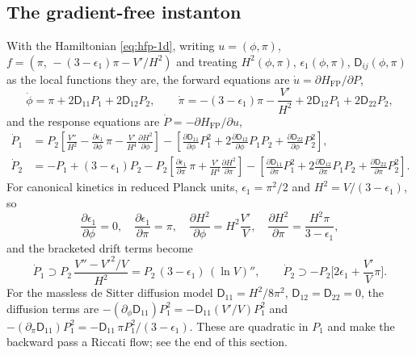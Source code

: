 \documentclass[a4paper,11pt]{article}
\newcommand{\epsSR}{\epsilon_1}              %
\newcommand{\Hub}{H}                         %
\newcommand{\field}{\phi}                    %
\newcommand{\mom}{\pi}                       %
\newcommand{\Vpot}{V}                        %
\newcommand{\Dcm}[1]{\mathsf{D}_{#1}}        %
\newcommand{\Hfp}{H_{\mathrm{FP}}}            %
\begin{document}
\subsection{The gradient-free instanton}
\label{sec:fullinstanton-eqs}

With the Hamiltonian \eqref{eq:hfp-1d}, writing $u=(\field,\mom)$,
$f=(\mom,\,-(3-\epsSR)\mom-\Vpot'/\Hub^2)$ and treating
$\Hub^2(\field,\mom)$, $\epsSR(\field,\mom)$, $\Dcm{ij}(\field,\mom)$ as the
local functions they are, the forward equations are $\dot u=\partial\Hfp/\partial P$,
\begin{equation}
    \dot\field = \mom + 2\Dcm{11}P_1 + 2\Dcm{12}P_2 ,
    \qquad
    \dot\mom = -(3-\epsSR)\mom - \frac{\Vpot'}{\Hub^2} + 2\Dcm{12}P_1 + 2\Dcm{22}P_2 ,
    \label{eq:fi-forward}
\end{equation}
and the response equations are $\dot P=-\partial\Hfp/\partial u$,
\begin{subequations}
\label{eq:fi-response}
\begin{align}
    \dot P_1
    & = P_2\left[\frac{\Vpot''}{\Hub^2} - \frac{\partial\epsSR}{\partial\field}\,\mom
    - \frac{\Vpot'}{\Hub^4}\frac{\partial\Hub^2}{\partial\field}\right]
    - \left[\frac{\partial\Dcm{11}}{\partial\field}P_1^2 + 2\frac{\partial\Dcm{12}}{\partial\field}P_1P_2 + \frac{\partial\Dcm{22}}{\partial\field}P_2^2\right] ,
    \label{eq:fi-P1}
    \\
    \dot P_2
    & = -P_1 + (3-\epsSR)P_2
    - P_2\left[\frac{\partial\epsSR}{\partial\mom}\,\mom + \frac{\Vpot'}{\Hub^4}\frac{\partial\Hub^2}{\partial\mom}\right]
    - \left[\frac{\partial\Dcm{11}}{\partial\mom}P_1^2 + 2\frac{\partial\Dcm{12}}{\partial\mom}P_1P_2 + \frac{\partial\Dcm{22}}{\partial\mom}P_2^2\right] .
    \label{eq:fi-P2}
\end{align}
\end{subequations}
For canonical kinetics in reduced Planck units, $\epsSR=\mom^2/2$ and
$\Hub^2=\Vpot/(3-\epsSR)$, so
\begin{equation}
    \frac{\partial\epsSR}{\partial\field}=0 , \quad
    \frac{\partial\epsSR}{\partial\mom}=\mom , \quad
    \frac{\partial\Hub^2}{\partial\field}=\Hub^2\frac{\Vpot'}{\Vpot} , \quad
    \frac{\partial\Hub^2}{\partial\mom}=\frac{\Hub^2\mom}{3-\epsSR} ,
\end{equation}
and the bracketed drift terms become
\begin{equation}
    \dot P_1 \supset P_2\,\frac{\Vpot''-\Vpot'^2/\Vpot}{\Hub^2} = P_2\,(3-\epsSR)\,(\ln\Vpot)'' ,
    \qquad
    \dot P_2 \supset -P_2\Big[2\epsSR + \frac{\Vpot'}{\Vpot}\mom\Big] .
    \label{eq:fi-canonical-terms}
\end{equation}
For the massless de Sitter diffusion model $\Dcm{11}=\Hub^2/8\pi^2$,
$\Dcm{12}=\Dcm{22}=0$, the diffusion terms are
$-(\partial_\field\Dcm{11})P_1^2 = -\Dcm{11}(\Vpot'/\Vpot)P_1^2$ and
$-(\partial_\mom\Dcm{11})P_1^2 = -\Dcm{11}\,\mom P_1^2/(3-\epsSR)$. These
are quadratic in $P_1$ and make the backward pass a Riccati flow; see the
end of this section.
\end{document}
